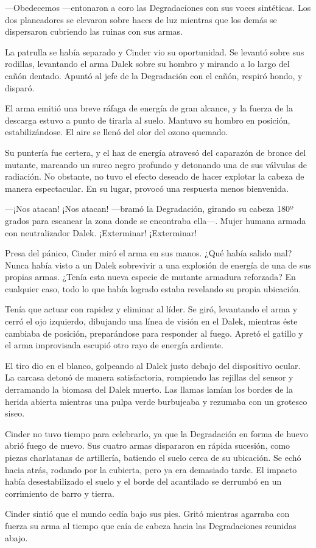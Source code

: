 —Obedecemos —entonaron a coro las Degradaciones con sus voces sintéticas. Los dos planeadores se elevaron sobre haces de luz mientras que los demás se dispersaron cubriendo las ruinas con sus armas.

La patrulla se había separado y Cinder vio su oportunidad. Se levantó sobre sus rodillas, levantando el arma Dalek sobre su hombro y mirando a lo largo del cañón dentado. Apuntó al jefe de la Degradación con el cañón, respiró hondo, y disparó.

El arma emitió una breve ráfaga de energía de gran alcance, y la fuerza de la descarga estuvo a punto de tirarla al suelo. Mantuvo su hombro en posición, estabilizándose. El aire se llenó del olor del ozono quemado.

Su puntería fue certera, y el haz de energía atravesó del caparazón de bronce del mutante, marcando un surco negro profundo y detonando una de sus válvulas de radiación. No obstante, no tuvo el efecto deseado de hacer explotar la cabeza de manera espectacular. En su lugar, provocó una respuesta menos bienvenida.



—¡Nos atacan! ¡Nos atacan! —bramó la Degradación, girando su cabeza 180º grados para escanear la zona donde se encontraba ella—. Mujer humana armada con neutralizador Dalek. ¡Exterminar! ¡Exterminar! 

Presa del pánico, Cinder miró el arma en sus manos. ¿Qué había salido mal? Nunca había visto a un Dalek sobrevivir a una explosión de energía de una de sus propias armas. ¿Tenía esta nueva especie de mutante armadura reforzada? En cualquier caso, todo lo que había logrado estaba revelando su propia ubicación.

Tenía que actuar con rapidez y eliminar al líder. Se giró, levantando el arma y cerró el ojo izquierdo, dibujando una línea de visión en el Dalek, mientras éste cambiaba de posición, preparándose para responder al fuego. Apretó el gatillo y el arma improvisada escupió otro rayo de energía ardiente.

El tiro dio en el blanco, golpeando al Dalek justo debajo del dispositivo ocular. La carcasa detonó de manera satisfactoria, rompiendo las rejillas del sensor y derramando la biomasa del Dalek muerto. Las llamas lamían los bordes de la herida abierta mientras una pulpa verde burbujeaba y rezumaba con un grotesco siseo.

Cinder no tuvo tiempo para celebrarlo, ya que la Degradación en forma de huevo abrió fuego de nuevo. Sus cuatro armas dispararon en rápida sucesión, como piezas charlatanas de artillería, batiendo el suelo cerca de su ubicación. Se echó hacia atrás, rodando por la cubierta, pero ya era demasiado tarde. El impacto había desestabilizado el suelo y el borde del acantilado se derrumbó en un corrimiento de barro y tierra.

Cinder sintió que el mundo cedía bajo sus pies. Gritó mientras agarraba con fuerza su arma al tiempo que caía de cabeza hacia las Degradaciones reunidas abajo.



